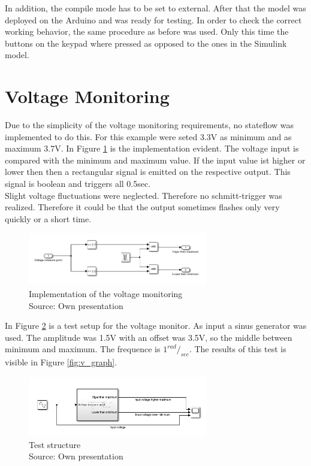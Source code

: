 		In addition, the compile mode has to be set to external. After that the model was deployed on the Arduino and was ready for testing. In order to check the correct working behavior, the same procedure as before was used. Only this time the buttons on the keypad where pressed as opposed to the ones in the Simulink model.

	
	
	\section{Voltage Monitoring}
	Due to the simplicity of the voltage monitoring requirements, no stateflow was implemented to do this. For this example were seted 3.3V as minimum  and as maximum 3.7V. In Figure \ref{fig:v_mon} is the implementation evident. The voltage input is compared with the minimum and maximum value. If the input value ist higher or lower then then a rectangular signal is emitted on the respective output. This signal is boolean and triggers all 0.5sec. \\
	Slight voltage fluctuations were neglected. Therefore no schmitt-trigger was realized. Therefore it could be that the output sometimes flashes only very quickly or a short time. 
		\begin{figure}[H]
			\centering
			\includegraphics[width=0.7\textwidth]{figures/v_monitor.png}
			\caption[Implementation of the voltage monitoring]{Implementation of the voltage monitoring\\ Source: Own presentation}
			\label{fig:v_mon}
		\end{figure}
	In Figure \ref*{fig:v_test} is a test setup for the voltage monitor. As input a sinus generator was used. The amplitude was 1.5V with an offset was 3.5V, so the middle between minimum and maximum. The frequence is $1^{rad}/_{sec}.$ The results of this test is visible in Figure \ref{fig:v_graph}.
		\begin{figure}[H]
			\centering
			\includegraphics[width=0.7\textwidth]{figures/v_monitor_testcase.png}
			\caption[Test structure]{Test structure\\ Source: Own presentation}
			\label{fig:v_test}
		\end{figure}
		
